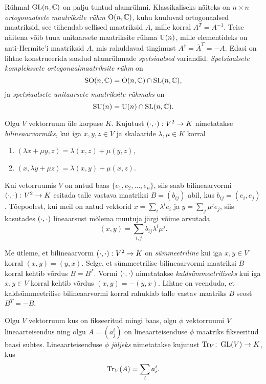 Rühmal $\operatorname{GL}(n, \mathbb{C})$ on palju tuntud alamrühmi. Klassikaliseks näiteks on
$n \times n$ \emph{ortogonaalsete maatriksite rühm} $\operatorname{O}(n, \mathbb{C})$, kuhu kuuluvad
ortogonaalsed maatriksid, see tähendab sellised maatriksid $A$, mille korral
$A^T = A^{-1}$. Teise näitena võib tuua unitaarsete maatriksite rühma $\operatorname{U}(n)$,
mille elementideks on anti-Hermite'i maatriksid $A$, mis rahuldavad tingimust
$A^\dag = \overline{A}^T = -A$. Edasi on lihtne konstrueerida saadud alamrühmade
\emph{spetsiaalsed} variandid. \emph{Spetsiaalsete komplekssete ortogonaalmaatriksite rühm} on
\[ \operatorname{SO}(n, \mathbb{C}) = \operatorname{O}(n, \mathbb{C}) \cap \operatorname{SL}(n, \mathbb{C}), \]
ja \emph{spetsiaalsete unitaarsete maatriksite rühmaks} on
\[ \operatorname{SU}(n) = \operatorname{U}(n) \cap \operatorname{SL}(n, \mathbb{C}). \]

\begin{dfn}
    Olgu $V$ vektorruum üle korpuse $K$. Kujutust $\left( \cdot, \cdot \right) \colon V^2 \to K$
    nimetatakse \emph{bilineaarvormiks}, kui iga $x, y, z \in V$
    ja skalaaride $\lambda, \mu \in K$ korral
    \begin{enumerate}[label=\roman*.]
        \item $(\lambda x + \mu y, z) = \lambda (x, z) + \mu (y, z)$,
        \item $(x, \lambda y + \mu z) = \lambda (x, y) + \mu (x, z)$.
    \end{enumerate}
\end{dfn}

Kui vetorruumis $V$ on antud baas $\{e_1, e_2, \dots, e_n\}$, siis saab
bilineaarvormi $\left( \cdot, \cdot \right) \colon V^2 \to K$ esitada talle vastava maatriksi
$B = (b_{ij})$ abil, kus $b_{ij} = (e_i, e_j)$. Tõepoolest, kui
meil on antud vektorid $x = \sum_i \lambda^i e_i$ ja $y = \sum_j \mu^j e_j$,
siis kasutades $\left( \cdot, \cdot \right)$ lineaarsust mõlema muutuja järgi võime arvutada
\[ (x, y) = \sum_{i, j} b_{ij} \lambda^i \mu^j. \]

Me ütleme, et bilineaarvorm $\left( \cdot, \cdot \right) \colon V^2 \to K$ on \emph{sümmeetriline} kui
iga $x, y \in V$ korral $(x, y) = (y, x)$. Selge, et sümmeetrilise
bilineaarvormi maatriksi $B$ korral kehtib võrdus $B = B^T$. Vormi $\left( \cdot, \cdot \right)$
nimetatakse \emph{kaldsümmeetriliseks} kui iga $x, y \in V$ korral kehtib
võrdus $(x, y) = - (y, x)$. Lihtne on veenduda, et kaldsümmeetrilise
bilineaarvormi korral rahuldab talle vastav maatriks $B$ seost
$B^T = -B$.

\begin{dfn}
    Olgu $V$ vektorruum kus on fikseeritud mingi baas, olgu $\phi$
    vektorruumi $V$ lineaarteisendus ning olgu $A = (a^i_j)$ on
    lineaarteisenduse $\phi$ maatriks fikseeritud baasi suhtes.
    Lineaarteisenduse $\phi$ \emph{jäljeks} nimetatakse kujutust
    $\operatorname{Tr}_V \colon \operatorname{GL}(V) \to K$, kus
    \[ \operatorname{Tr}_V(A) = \sum_i a^i_i. \]
\end{dfn}


